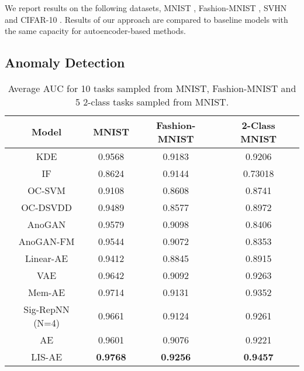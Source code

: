 \documentclass[acmtog, nonacm]{acmart}
\begin{document}
\noindent
We report results on the following datasets, MNIST \cite{lecun-mnisthandwrittendigit-2010}, Fashion-MNIST \cite{xiao2017fashion}, SVHN \cite{netzer2011reading} and CIFAR-10 \cite{krizhevsky2009learning}. Results of our approach are compared to baseline models with the same capacity for autoencoder-based methods.

\subsection{Anomaly Detection}
\begin{table}
\caption{Average AUC for 10 tasks sampled from MNIST, Fashion-MNIST and 5 2-class tasks sampled from MNIST.}
\label{T1}
    \begin{tabular}{c|ccc}
    \toprule
    Model & MNIST & Fashion-MNIST&2-Class MNIST \\
 \midrule
    KDE                    &0.9568 &0.9183& 0.9206\\
    IF                     &0.8624 &0.9144& 0.73018\\
    OC-SVM                 &0.9108 &0.8608&0.8741\\
    OC-DSVDD               &0.9489 &0.8577&0.8972\\ 
    \midrule        
    AnoGAN               &0.9579 &0.9098&0.8406\\
    AnoGAN-FM          &0.9544 &0.9072&0.8353\\
    Linear-AE              &0.9412  &0.8845 &0.8915\\
    VAE                    &0.9642  &0.9092 &0.9263\\
    Mem-AE                 &0.9714  &0.9131 &0.9352\\
    Sig-RepNN (N=4)        &0.9661  &0.9124 &0.9261\\
    AE                     &0.9601  &0.9076 &0.9221\\
    LIS-AE                 &\bf0.9768  &\bf0.9256&\bf0.9457\\
    \bottomrule
    \end{tabular}
\end{table}
\end{document}
